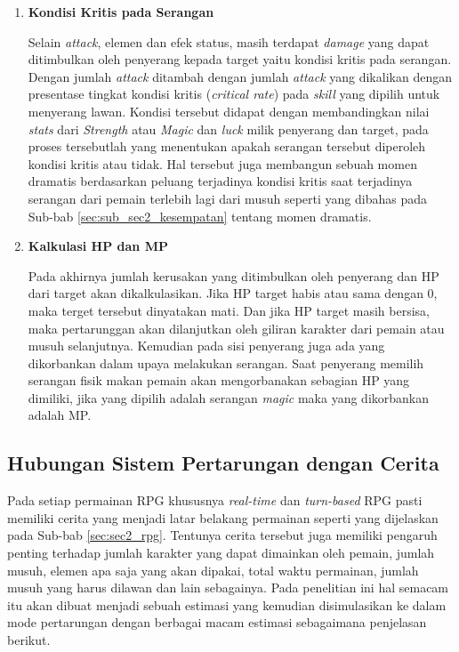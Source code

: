 \begin{subs}
\begin{enumerate}[label=\textbf{\arabic*).}]
		\item \textbf{Kondisi Kritis pada Serangan}
		
		Selain \textit{attack}, elemen dan efek status, masih terdapat \textit{damage} yang dapat ditimbulkan oleh penyerang kepada target yaitu kondisi kritis pada serangan. Dengan jumlah \textit{attack} ditambah dengan jumlah \textit{attack} yang dikalikan dengan presentase tingkat kondisi kritis (\textit{critical rate}) pada \textit{skill} yang dipilih untuk menyerang lawan. Kondisi tersebut didapat dengan membandingkan nilai \textit{stats} dari \textit{Strength} atau \textit{Magic} dan \textit{luck} milik penyerang dan target, pada proses tersebutlah yang menentukan apakah serangan tersebut diperoleh kondisi kritis atau tidak. Hal tersebut juga membangun sebuah momen dramatis berdasarkan peluang terjadinya kondisi kritis saat terjadinya serangan dari pemain terlebih lagi dari musuh seperti yang dibahas pada Sub-bab \ref{sec:sub_sec2_kesempatan} tentang momen dramatis.
		\vspace{1ex}
		
		\item \textbf{Kalkulasi HP dan MP}
		
		Pada akhirnya jumlah kerusakan yang ditimbulkan oleh penyerang dan HP dari target akan dikalkulasikan. Jika HP target habis atau sama dengan 0, maka terget tersebut dinyatakan mati. Dan jika HP target masih bersisa, maka pertarunggan akan dilanjutkan oleh giliran karakter dari pemain atau musuh selanjutnya. Kemudian pada sisi penyerang juga ada yang dikorbankan dalam upaya melakukan serangan. Saat penyerang memilih serangan fisik makan pemain akan mengorbanakan sebagian HP yang dimiliki, jika yang dipilih adalah serangan \textit{magic} maka yang dikorbankan adalah MP.
	\end{enumerate}
	
	\subsection{Hubungan Sistem Pertarungan dengan Cerita}
	\label{sec:sub_sec3_story}
	\vspace{1ex}
	
	Pada setiap permainan RPG khususnya \textit{real-time} dan \textit{turn-based} RPG pasti memiliki cerita yang menjadi latar belakang permainan seperti yang dijelaskan pada Sub-bab \ref{sec:sec2_rpg}. Tentunya cerita tersebut juga memiliki pengaruh penting terhadap jumlah karakter yang dapat dimainkan oleh pemain, jumlah musuh, elemen apa saja yang akan dipakai, total waktu permainan, jumlah musuh yang harus dilawan dan lain sebagainya. Pada penelitian ini hal semacam itu akan dibuat menjadi sebuah estimasi yang kemudian disimulasikan ke dalam mode pertarungan dengan berbagai macam estimasi sebagaimana penjelasan berikut.
	\vspace{1ex}
	

\end{subs}
